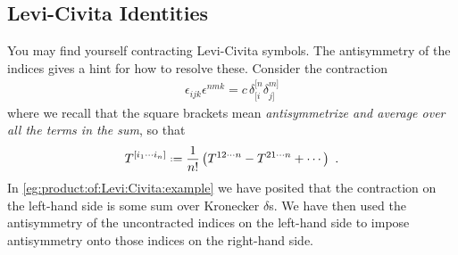 \begin{subappendices}
\section{Levi-Civita Identities}

You may find yourself contracting Levi-Civita symbols. The antisymmetry of the indices gives a hint for how to resolve these. Consider the contraction
\begin{align}
\epsilon_{ijk}\epsilon^{nmk}
= c \, \delta^{[n}_{[i}\delta^{m]}_{j]}    
\label{eg:product:of:Levi:Civita:example}
\end{align}
where we recall that the square brackets mean \emph{antisymmetrize and average over all the terms in the sum}, so that 
\begin{align}
    T^{[i_1\cdots i_n]} \defeq \frac{1}{n!}
    \left(  
        T^{12\cdots n}
        - T^{21\cdots n}
        + \cdots
    \right) \ .
\end{align}
In \eqref{eg:product:of:Levi:Civita:example} we have posited that the contraction on the left-hand side is some sum over Kronecker $\delta$s. We have then used the antisymmetry of the uncontracted indices on the left-hand side to impose antisymmetry onto those indices on the right-hand side. 


\end{subappendices}
